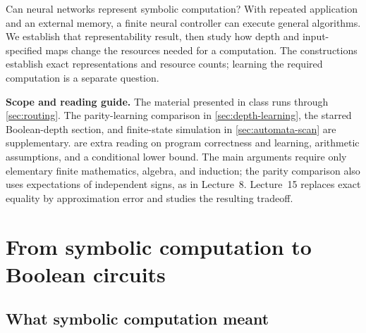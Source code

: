 \documentclass[11pt,twoside]{article}
\theoremstyle{definition}
\theoremstyle{remark}
\begin{document}
\begin{center}
\end{center}

Can neural networks represent symbolic computation? With repeated application
and an external memory, a finite neural controller can execute general
algorithms. We establish that representability result, then study how depth
and input-specified maps change the resources needed for a computation.
The constructions establish exact representations and resource counts;
learning the required computation is a separate question.

\noindent\textbf{Scope and reading guide.}
The material presented in class runs through \cref{sec:routing}. The
parity-learning comparison in \cref{sec:depth-learning}, the starred
Boolean-depth section, and finite-state simulation in \cref{sec:automata-scan}
are supplementary. 
are extra reading on program correctness and learning, arithmetic assumptions,
and a conditional lower bound. The main arguments require only elementary
finite mathematics, algebra, and induction; the parity comparison also uses
expectations of independent signs, as in Lecture~8. Lecture~15 replaces exact
equality by approximation error and studies the resulting tradeoff.

\section{From symbolic computation to Boolean circuits}
\label{sec:gates}

\subsection{What symbolic computation meant}
\end{document}
